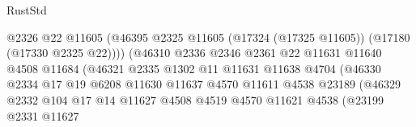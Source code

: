 \begin{lexlean}{RustStd}
\begin{coremodule}
{\begin{coremodule}
{{{{{{{{{{{{{{{{{{{{{{{{{{{{{{{{{{{{{{{{{{{{{{{{{{{{{{{                                            @2326
                                            @22
                                            @11605
                                            (@46395
                                              @2325
                                              @11605
                                              (@17324 (@17325 @11605))
                                              (@17180 (@17330 @2325 @22))))
                                          (@46310
                                            @2336
                                            @2346
                                            @2361
                                            @22
                                            @11631
                                            @11640
                                            @4508
                                            @11684
                                            (@46321
                                              @2335
                                              @1302
                                              @11
                                              @11631
                                              @11638
                                              @4704
                                              (@46330
                                                @2334
                                                @17
                                                @19
                                                @6208
                                                @11630
                                                @11637
                                                @4570
                                                @11611
                                                @4538
                                                @23189
                                                (@46329
                                                  @2332
                                                  @104
                                                  @17
                                                  @14
                                                  @11627
                                                  @4508
                                                  @4519
                                                  @4570
                                                  @11621
                                                  @4538
                                                  (@23199
                                                    @2331
                                                    @11627
}}}}}}}}}}}}}}}}}}}}}}}}}}}}}}}}}}}}}}}}}}}}}}}}}}}}}}}
\end{coremodule}}
\end{coremodule}
\end{lexlean}
